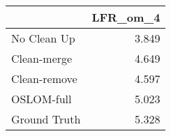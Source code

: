\begin{tabular}{lr}
\toprule
{} & LFR_om_4 \\
\midrule
No Clean Up  &    3.849 \\
Clean-merge  &    4.649 \\
Clean-remove &    4.597 \\
OSLOM-full   &    5.023 \\
Ground Truth &    5.328 \\
\bottomrule
\end{tabular}
